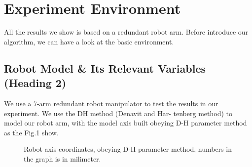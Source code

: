 \documentclass[letterpaper, 10 pt, conference]{ieeeconf}  %
\begin{document}
\section{Experiment Environment}

All the results we show is based on a redundant robot arm. Before introduce our algorithm, we can have a look at the basic environment.

\subsection{Robot Model \& Its Relevant Variables (Heading 2)}

We use a 7-arm redundant robot manipulator to test the results in our experiment. We use the DH method (Denavit and Har- tenberg method) to model our robot arm, with the model axis built obeying D-H parameter method as the Fig.1 show.

   \begin{figure}[thpb]
      \centering
      \caption{Robot axis coordinates, obeying D-H parameter method, numbers in the graph is in milimeter.}
      \label{figurelabel}
   \end{figure}
   
\end{document}
